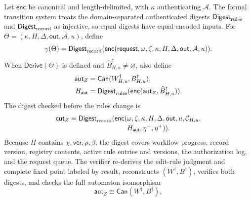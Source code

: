 Let \(\mathsf{enc}\) be canonical and length-delimited, with \(\kappa\) authenticating \(\mathcal A\).
The formal transition system treats the domain-separated authenticated digests \(\mathsf{Digest}_{\rm rules}\) and \(\mathsf{Digest}_{\rm record}\) as injective, so equal digests have equal encoded inputs.
For \(\Theta=(\kappa,H,\Delta,\mathsf{out},\mathcal A,u)\), define
\[
\gamma(\Theta)
 =\mathsf{Digest}_{\rm record}(
   \mathsf{enc}(\mathsf{request},\omega,\zeta,\kappa,
   H,\Delta,\mathsf{out},\mathcal A,u)).
\]
When \(\mathsf{Derive}(\Theta)\) is defined and
\(\widehat B^\dagger_{H,u}\ne\varnothing\), also define
\[
\begin{aligned}
\mathsf{aut}_Z
 &=\mathsf{Can}(W^\dagger_{H,u},B^\dagger_{H,u}),\\
H_{\mathsf{aut}}
 &=\mathsf{Digest}_{\rm rules}(
   \mathsf{enc}(\mathsf{aut}_Z,\widehat B^\dagger_{H,u})).
\end{aligned}
\]
The digest checked before the rules change is
\begin{equation}
\label{eq:checked-record-digest}
\begin{split}
 \mathsf{cut}_Z=
 \mathsf{Digest}_{\rm record}(\mathsf{enc}(&\omega,\zeta,\kappa,H,\Delta,
     \mathsf{out},u,\mathcal C_{H,u},\\[-2pt]
     &H_{\mathsf{aut}},\eta^-,\eta^+)).
\end{split}
\end{equation}
Because \(H\) contains \(\chi,\mathsf{ver},\rho,\beta\), the digest covers workflow progress, record version, registry contents, active rule entries and versions, the authorization log, and the request queue.
The verifier re-derives the edit-rule judgment and complete fixed point labeled by result, reconstructs \((W^\dagger,B^\dagger)\), verifies both digests, and checks the full automaton isomorphism
\[
 \mathsf{aut}_Z\cong\mathsf{Can}(W^\dagger,B^\dagger),
\]
